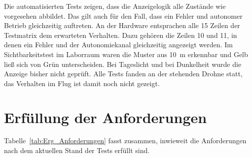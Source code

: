     Die automatisierten Tests zeigen, dass die Anzeigelogik alle Zustände wie vorgesehen abbildet. Das gilt auch für den Fall, dass ein Fehler und autonomer Betrieb gleichzeitig auftreten. An der Hardware entsprachen alle 15 Zeilen der Testmatrix dem erwarteten Verhalten. Dazu gehören die Zeilen 10 und 11, in denen ein Fehler und der Autonomiekanal gleichzeitig angezeigt werden. Im Sichtbarkeitstest im Laborraum waren die Muster aus \SI{10}{\metre} erkennbar und Gelb ließ sich von Grün unterscheiden. Bei Tageslicht und bei Dunkelheit wurde die Anzeige bisher nicht geprüft. Alle Tests fanden an der stehenden Drohne statt, das Verhalten im Flug ist damit noch nicht gezeigt. %

    \section{Erfüllung der Anforderungen}
    \label{sec:Diskussion_Anforderungen}

    Tabelle~\ref{tab:Erg_Anforderungen} fasst zusammen, inwieweit die Anforderungen nach dem aktuellen Stand der Tests erfüllt sind.

